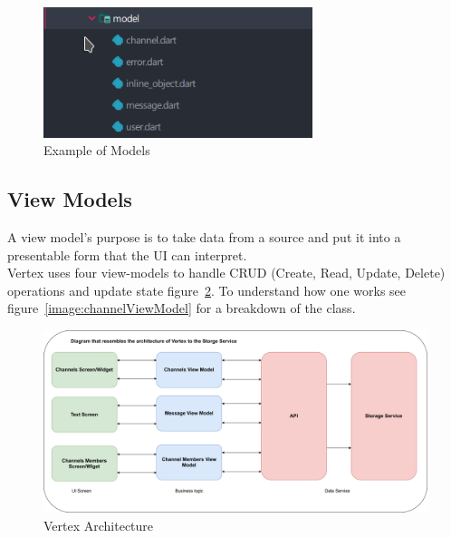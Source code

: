 \begin{figure}[h!]
    \caption{Example of Models}
    \label{image:models}
    \centering
    \includegraphics[width=0.7\textwidth]{images/models.png}
\end{figure}

\subsection{View Models}
A view model's purpose is to take data from a source and put it into a presentable form that the UI can interpret.
\\ Vertex uses four view-models to handle CRUD (Create, Read, Update, Delete) operations and update state figure~\ref{image:vertexArch}. To understand how one works see figure~\ref{image:channelViewModel} for a breakdown of the class.

\begin{figure}[h!]
    \caption{Vertex Architecture}
    \label{image:vertexArch}
    \centering
    \includegraphics[width=1.0\textwidth]{images/vertex_arch.png}
\end{figure}

